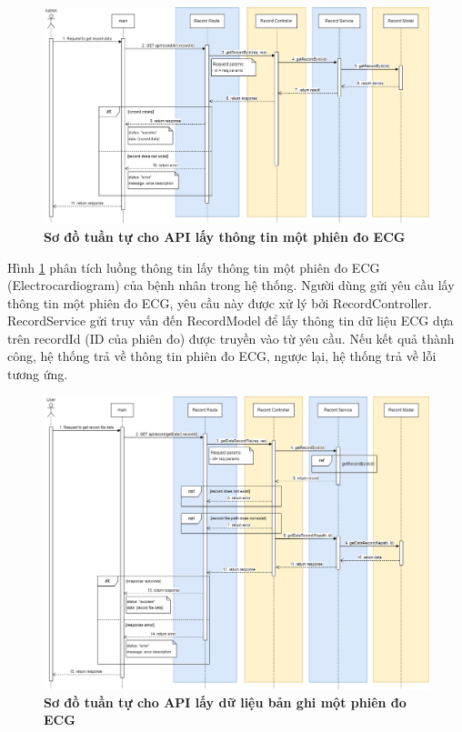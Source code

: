 \begin{figure}[H]
  \centering
  \includegraphics[scale=0.35]{Images/sequence_api/getRecordById.png}
  \caption[Sơ đồ tuần tự cho API lấy thông tin một phiên đo ECG ]{\bfseries \fontsize{12pt}{0pt}
  \selectfont Sơ đồ tuần tự cho API lấy thông tin một phiên đo ECG }
  \label{api_getRecordById} %
\end{figure}
Hình \ref{api_getRecordById} phân tích luồng thông tin lấy thông tin một phiên đo ECG (Electrocardiogram) của bệnh nhân trong hệ thống. Người dùng gửi yêu cầu lấy thông tin một phiên đo ECG, 
yêu cầu này được xử lý bởi RecordController. RecordService gửi truy vấn đến RecordModel để lấy thông tin dữ liệu ECG dựa trên recordId (ID của phiên đo) được truyền vào từ yêu cầu. 
Nếu kết quả thành công, hệ thống trả về thông tin phiên đo ECG, ngược lại, hệ thống trả về lỗi tương ứng.
 \begin{figure}[H]
  \centering
  \includegraphics[scale=0.33]{Images/sequence_api/getRecordDataById.png}
  \caption[Sơ đồ tuần tự cho API lấy dữ liệu bản ghi một phiên đo ECG ]{\bfseries \fontsize{12pt}{0pt}
  \selectfont Sơ đồ tuần tự cho API lấy dữ liệu bản ghi một phiên đo ECG }
  \label{api_getRecordDataById} %
\end{figure}
